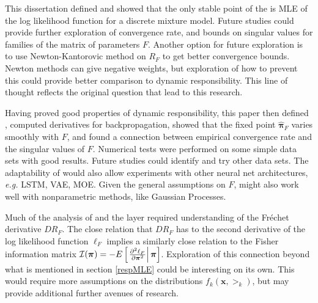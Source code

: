 \label{sect:conclusions}
This dissertation defined \DR and showed that the only stable point of \DR the is MLE of the log likelihood function for a discrete mixture model. Future studies could provide further exploration of convergence rate, and bounds on singular values for families of the matrix of parameters \( F \). Another option for future exploration is to use Newton-Kantorovic method on \( R_F \) to get better convergence bounds.  Newton methods can give negative weights, but exploration of how to prevent this could provide better comparison to dynamic responsibility.  This line of thought reflects the original question that lead to this research.

Having proved good properties of dynamic responsibility, this paper then defined \RS, computed derivatives for backpropagation, showed that  the fixed point \( \hat{\bm \pi}_F \) varies smoothly with \( F \), and found a connection  between empirical convergence rate and the singular values of \( F \). Numerical tests were performed on some simple data sets with good results. Future studies could identify and try other data sets. The adaptability of \RS would also allow experiments with other neural net architectures, \textit{e.g.} LSTM, VAE, MOE. Given the general assumptions on \( F \), \RS might also work well with nonparametric methods, like Gaussian Processes.

Much of the analysis of \DR and the \RS layer required understanding of the Fr\'{e}chet derivative \( DR_F \). The close relation that \( DR_F \) has to the second derivative of the log likelihood function \( \ell_{F} \) implies a similarly close relation to the Fisher information matrix \( \mathcal{I}(\bm\pi) = -E\left[\left.\pdv[2]{\ell_F}{\bm\pi}\right|\bm\pi\right] \). Exploration of this connection beyond what is mentioned in section \ref{respMLE} could be interesting on its own.  This would require more assumptions on the distributions \( f_k(\bm x,\bm\gt_k) \), but may provide additional further avenues of research.

